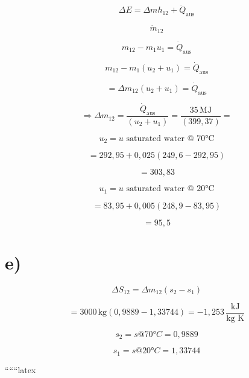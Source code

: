 \[
\Delta E = \Delta m h_{12} + \dot{Q}_{\text{aus}}
\]

\[
\dot{m}_{12}
\]

\[
m_{12} - m_{1} u_{1} = \dot{Q}_{\text{aus}}
\]

\[
m_{12} - m_{1} (u_{2} + u_{1}) = \dot{Q}_{\text{aus}}
\]

\[
= \Delta m_{12} (u_{2} + u_{1}) = \dot{Q}_{\text{aus}}
\]

\[
\Rightarrow \Delta m_{12} = \frac{\dot{Q}_{\text{aus}}}{(u_{2} + u_{1})} = \frac{35 \, \text{MJ}}{(399,37)} =
\]

\[
u_{2} = u \text{ saturated water @ 70°C}
\]

\[
= 292,95 + 0,025 (249,6 - 292,95)
\]

\[
= 303,83
\]

\[
u_{1} = u \text{ saturated water @ 20°C}
\]

\[
= 83,95 + 0,005 (248,9 - 83,95)
\]

\[
= 95,5
\]

\section*{e)}

\[
\Delta S_{12} = \Delta m_{12} (s_{2} - s_{1})
\]

\[
= 3000 \, \text{kg} (0,9889 - 1,33744) = -1,253 \, \frac{\text{kJ}}{\text{kg K}}
\]

\[
s_{2} = s @ 70°C = 0,9889
\]

\[
s_{1} = s @ 20°C = 1,33744
\]

``````latex


